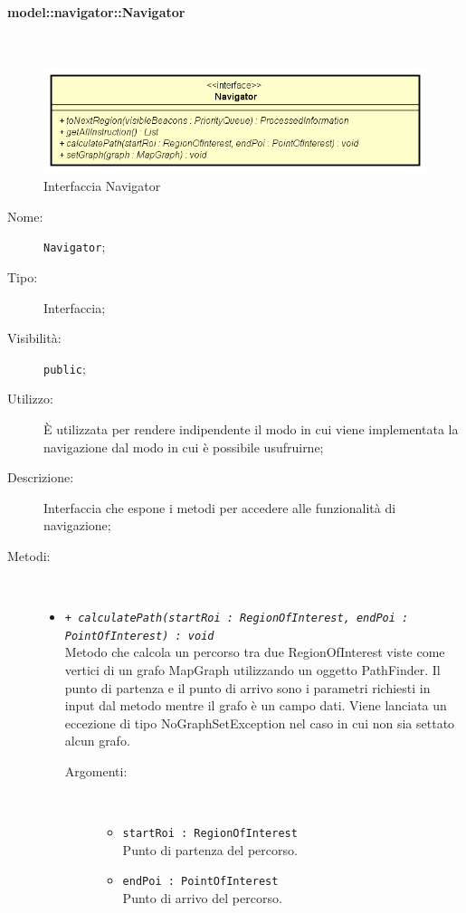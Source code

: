\documentclass[../DefinizioneDiProdotto.tex]{subfiles}
\begin{document}
\paragraph{model::navigator::Navigator}
\
\begin{figure}[H]
	\centering
	\includegraphics[width=\maxwidth]{img/Navigator.png}
	\caption{Interfaccia Navigator}\label{fig:model::navigator::Navigator} 
\end{figure}
\begin{description}
	\item[Nome:] \texttt{Navigator};
	\item[Tipo:] Interfaccia;
	\item[Visibilità:] \texttt{public};
	\item[Utilizzo:] È utilizzata per rendere indipendente il modo in cui viene implementata la navigazione dal modo in cui è possibile usufruirne;
	\item[Descrizione:] Interfaccia che espone i metodi per accedere alle funzionalità di navigazione;
	\item[Metodi:] \
	\begin{itemize}
		\item \texttt{+ \textit{calculatePath(startRoi : RegionOfInterest, endPoi : PointOfInterest) : void}}\\
		Metodo che calcola un percorso tra due RegionOfInterest viste come vertici di un grafo MapGraph utilizzando un oggetto PathFinder. Il punto di partenza e il punto di arrivo sono i parametri richiesti in input dal metodo mentre il grafo è un campo dati. Viene lanciata un eccezione di tipo NoGraphSetException nel caso in cui non sia settato alcun grafo.
		\begin{description}
			\item[Argomenti:] \
			\begin{itemize}
				\item \texttt{startRoi : RegionOfInterest}\\
				Punto di partenza del percorso.\item \texttt{endPoi : PointOfInterest}\\
				Punto di arrivo del percorso.\end{itemize}

\end{description}
\end{itemize}
\end{description}
\end{document}
